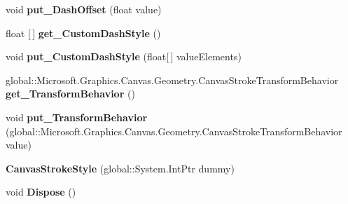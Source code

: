 \begin{DoxyCompactItemize}
void {\bfseries put\+\_\+\+Dash\+Offset} (float value)
\item 
\mbox{\label{class_microsoft_1_1_graphics_1_1_canvas_1_1_geometry_1_1_canvas_stroke_style_aed5aa05f608f3835623113c1f789483d}} 
float \mbox{[}$\,$\mbox{]} {\bfseries get\+\_\+\+Custom\+Dash\+Style} ()
\item 
\mbox{\label{class_microsoft_1_1_graphics_1_1_canvas_1_1_geometry_1_1_canvas_stroke_style_aeae34150ee1e2fcb07c434a9371be1da}} 
void {\bfseries put\+\_\+\+Custom\+Dash\+Style} (float\mbox{[}$\,$\mbox{]} value\+Elements)
\item 
\mbox{\label{class_microsoft_1_1_graphics_1_1_canvas_1_1_geometry_1_1_canvas_stroke_style_a26b6c215fb7192fa54e07e53785f0568}} 
global\+::\+Microsoft.\+Graphics.\+Canvas.\+Geometry.\+Canvas\+Stroke\+Transform\+Behavior {\bfseries get\+\_\+\+Transform\+Behavior} ()
\item 
\mbox{\label{class_microsoft_1_1_graphics_1_1_canvas_1_1_geometry_1_1_canvas_stroke_style_acc734915b10b7dd019e5423b04d56a48}} 
void {\bfseries put\+\_\+\+Transform\+Behavior} (global\+::\+Microsoft.\+Graphics.\+Canvas.\+Geometry.\+Canvas\+Stroke\+Transform\+Behavior value)
\item 
\mbox{\label{class_microsoft_1_1_graphics_1_1_canvas_1_1_geometry_1_1_canvas_stroke_style_a84473c4c8d10c25462fa224a25dae41b}} 
{\bfseries Canvas\+Stroke\+Style} (global\+::\+System.\+Int\+Ptr dummy)
\item 
\mbox{\label{class_microsoft_1_1_graphics_1_1_canvas_1_1_geometry_1_1_canvas_stroke_style_ad363b1ddc2f498a833220cbfda7cee42}} 
void {\bfseries Dispose} ()
\item 
\mbox{\label{class_microsoft_1_1_graphics_1_1_canvas_1_1_geometry_1_1_canvas_stroke_style_ad88c6468f388b2eb08a9719477f05865}} 

\end{DoxyCompactItemize}
